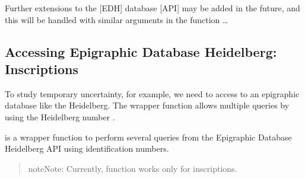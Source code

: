 \documentclass[a4paper,12pt,english]{sphinxhowto}
\begin{document}
\begin{sphinxVerbatim}[commandchars=\\\{\},formatcom=\footnotesize]
  
\end{sphinxVerbatim}

Further extensions to the {[}EDH{]} database {[}API{]} may be added in the future, and this will be
handled with similar arguments in the  function …



\subsection{Accessing Epigraphic Database Heidelberg: Inscriptions}
\label{\detokenize{Epigraphic:accessing-epigraphic-database-heidelberg-inscriptions}}

\begin{fulllineitems}
\label{\detokenize{Epigraphic:get.edhw}}
\end{fulllineitems}


\begin{sphinxVerbatim}[commandchars=\\\{\},formatcom=\footnotesize]
  
\end{sphinxVerbatim}

To study temporary uncertainty, for example, we need to access to an epigraphic database like the Heidelberg.
The wrapper function  allows multiple queries by using the Heidelberg number .

 is a wrapper function to perform several queries from the Epigraphic Database Heidelberg API using
identification numbers.
\begin{quote}

\begin{sphinxadmonition}{note}{Note:}
Currently, function  works only for inscriptions.
\end{sphinxadmonition}
\end{quote}
\end{document}
